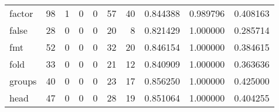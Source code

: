 \begin{tabular}{lrrrrrrrrr}
factor    &                                        98 &                                                  1 &                                                  0 &                                                  0 &                                                 57 &                                                 40 &                                           0.844388 &                               0.989796 &                             0.408163 \\
false     &                                        28 &                                                  0 &                                                  0 &                                                  0 &                                                 20 &                                                  8 &                                           0.821429 &                               1.000000 &                             0.285714 \\
fmt       &                                        52 &                                                  0 &                                                  0 &                                                  0 &                                                 32 &                                                 20 &                                           0.846154 &                               1.000000 &                             0.384615 \\
fold      &                                        33 &                                                  0 &                                                  0 &                                                  0 &                                                 21 &                                                 12 &                                           0.840909 &                               1.000000 &                             0.363636 \\
groups    &                                        40 &                                                  0 &                                                  0 &                                                  0 &                                                 23 &                                                 17 &                                           0.856250 &                               1.000000 &                             0.425000 \\
head      &                                        47 &                                                  0 &                                                  0 &                                                  0 &                                                 28 &                                                 19 &                                           0.851064 &                               1.000000 &                             0.404255 \\

\end{tabular}
